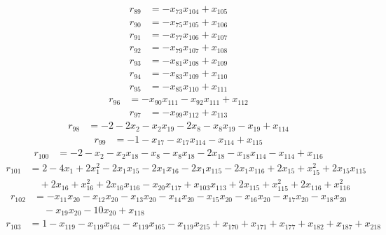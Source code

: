 \begin{align*}
r_{89}&=
-x_{73}x_{104}+x_{105}
\end{align*}
\begin{align*}
r_{90}&=
-x_{75}x_{105}+x_{106}
\end{align*}
\begin{align*}
r_{91}&=
-x_{77}x_{106}+x_{107}
\end{align*}
\begin{align*}
r_{92}&=
-x_{79}x_{107}+x_{108}
\end{align*}
\begin{align*}
r_{93}&=
-x_{81}x_{108}+x_{109}
\end{align*}
\begin{align*}
r_{94}&=
-x_{83}x_{109}+x_{110}
\end{align*}
\begin{align*}
r_{95}&=
-x_{85}x_{110}+x_{111}
\end{align*}
\begin{align*}
r_{96}&=
-x_{90}x_{111}-x_{92}x_{111}+x_{112}
\end{align*}
\begin{align*}
r_{97}&=
-x_{99}x_{112}+x_{113}
\end{align*}
\begin{align*}
r_{98}&=
-2-2x_{2}-x_{2}x_{19}-2x_{8}-x_{8}x_{19}-x_{19}+x_{114}
\end{align*}
\begin{align*}
r_{99}&=
-1-x_{17}-x_{17}x_{114}-x_{114}+x_{115}
\end{align*}
\begin{align*}
r_{100}&=
-2-x_{2}-x_{2}x_{18}-x_{8}-x_{8}x_{18}-2x_{18}-x_{18}x_{114}-x_{114}+x_{116}
\end{align*}
\begin{align*}
r_{101}&=
2-4x_{1}+2x_{1}^{2}-2x_{1}x_{15}-2x_{1}x_{16}-2x_{1}x_{115}-2x_{1}x_{116}+2x_{15}+x_{15}^{2}+2x_{15}x_{115} \\
&\quad +2x_{16}+x_{16}^{2}+2x_{16}x_{116}-x_{20}x_{117}+x_{103}x_{113}+2x_{115}+x_{115}^{2}+2x_{116}+x_{116}^{2}
\end{align*}
\begin{align*}
r_{102}&=
-x_{11}x_{20}-x_{12}x_{20}-x_{13}x_{20}-x_{14}x_{20}-x_{15}x_{20}-x_{16}x_{20}-x_{17}x_{20}-x_{18}x_{20} \\
&\quad -x_{19}x_{20}-10x_{20}+x_{118}
\end{align*}
\begin{align*}
r_{103}&=
1-x_{119}-x_{119}x_{164}-x_{119}x_{165}-x_{119}x_{215}+x_{170}+x_{171}+x_{177}+x_{182}+x_{187}+x_{218}
\end{align*}
